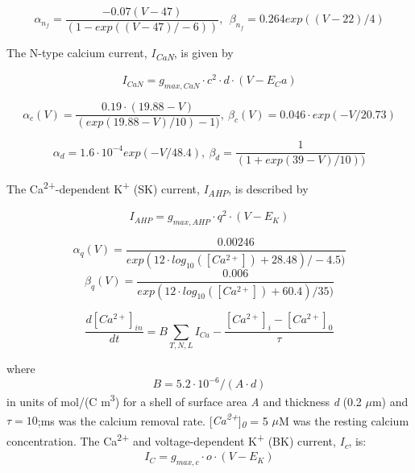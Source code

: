 \documentclass[12pt]{article}
\begin{document}
\begin{equation}
\alpha_{n_f}=\frac{-0.07(V-47)}{(1-exp((V-47)/-6))}, \ \  \beta_{n_f}=0.264exp((V-22)/4)
\end{equation}

The N-type calcium current, \textit{I}\textit{\textsubscript{CaN}}, is given by

\begin{equation}
I_{CaN}=g_{max, CaN} \cdot c^2 \cdot d \cdot (V-E_Ca)
\end{equation}

\begin{equation}
\alpha_c(V)=\frac{0.19\cdot(19.88-V)}{(exp(19.88-V)/10)-1)}, \  \beta_c(V)=0.046 \cdot exp(-V/20.73)
\end{equation}

\begin{equation}
\alpha_d=1.6\cdot10^{-4}exp(-V/48.4) , \  \beta_d=\frac 1{(1+exp(39-V)/10))}
\end{equation}

The Ca\textsuperscript{2+}-dependent K\textsuperscript{+} (SK) current, \textit{I\textsubscript{AHP}}, is described by

\begin{equation}
I_{AHP} = g_{max, AHP} \cdot q^2 \cdot (V-E_K)
\end{equation}

\begin{equation}
\alpha_q(V)=\frac{0.00246}{exp(12\cdot log_{10}([Ca^{2+}])+28.48)/-4.5)}
\end{equation} 
\begin{equation}
\beta_q(V)=\frac{0.006}{exp(12\cdot log_{10}([Ca^{2+}])+60.4)/35)}
\end{equation}

\begin{equation}
\frac{d[Ca^{2+}]_{in}}{dt}=B\sum_{T, N, L}
I_{Ca}-\frac{[Ca^{2+}]_i-[Ca^{2+}]_0}{\tau}
\end{equation}

where
\begin{equation}
B = 5.2\cdot 10^{-6}/(A \cdot d)
\end{equation}
in units of mol/(C m\textsuperscript{3}) for a shell of
surface area \textit{A} and thickness \textit{d} (0.2 $\mu $m) and  $\tau=10$;ms was the calcium removal rate. [\textit{Ca\textsuperscript{2+}}]\textit{\textsubscript{0}} = 5 $\mu$M was the resting calcium concentration. 
The Ca\textsuperscript{2+} and voltage-dependent K\textsuperscript{+} (BK) current, \textit{I\textsubscript{c}}, is:
\begin{equation}
I_C=g_{max, c} \cdot o \cdot (V-E_K)
\end{equation}
\end{document}
